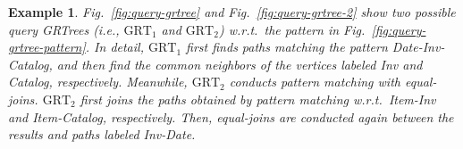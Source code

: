 \documentclass[sigconf, nonacm]{acmart}
\newtheorem{example}{Example}
\begin{document}
\begin{example}
Fig.~\ref{fig:query-grtree} and Fig.~\ref{fig:query-grtree-2} show two possible query GRTrees (i.e., $\text{GRT}_1$ and $\text{GRT}_2$) w.r.t.~the pattern in Fig.~\ref{fig:query-grtree-pattern}.
In detail, $\text{GRT}_1$ first finds paths matching the pattern \textit{Date}-\textit{Inv}-\textit{Catalog}, and then find the common neighbors of the vertices labeled \textit{Inv} and \textit{Catalog}, respectively.
Meanwhile, $\text{GRT}_2$ conducts pattern matching with equal-joins.
$\text{GRT}_2$ first joins the paths obtained by pattern matching w.r.t.~\textit{Item}-\textit{Inv} and \textit{Item}-\textit{Catalog}, respectively.
Then, equal-joins are conducted again between the results and paths labeled \textit{Inv}-\textit{Date}.
\end{example}
\end{document}
